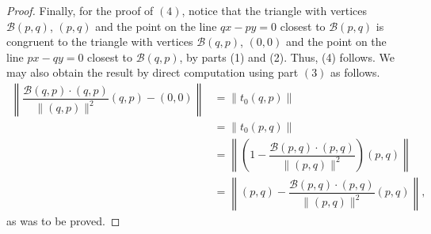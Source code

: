 \documentclass[10pt,a4paper]{amsart}
\newcommand{\B}{\mathcal B}
\begin{document}
\begin{proof}
 
 
  Finally, for the proof of $(4)$, notice that the triangle with vertices $\B(p,q)$, $(p,q)$ and the point on the line $qx-py=0$ closest to $\B(p,q)$ is congruent to the  triangle with vertices $\B(q,p)$, $(0,0)$ and the point on the line $px-qy=0$ closest to $\B(q,p)$, by parts (1) and (2). Thus, (4) follows.  We may also obtain the result by direct computation using part $(3)$  as follows.
\begin{align*}
    \left\|\dfrac{\B(q,p)\cdot (q,p)}{\|(q,p)\|^2} (q,p) -(0,0)  \right\|
    &= \left\| t_0 (q,p)   \right\|  \\
    &=\left\| t_0 (p,q)   \right\|  \\
    &=\left\|
    \left(1-\dfrac{\B(p,q)\cdot (p,q)}{\|(p,q)\|^2}\right) (p,q)
    \right\|\\
    &=\left\|(p,q)-
    \dfrac{\B(p,q)\cdot (p,q)}{\|(p,q)\|^2} (p,q)
    \right\|,
\end{align*}
as was to be proved.
\end{proof}
\end{document}

